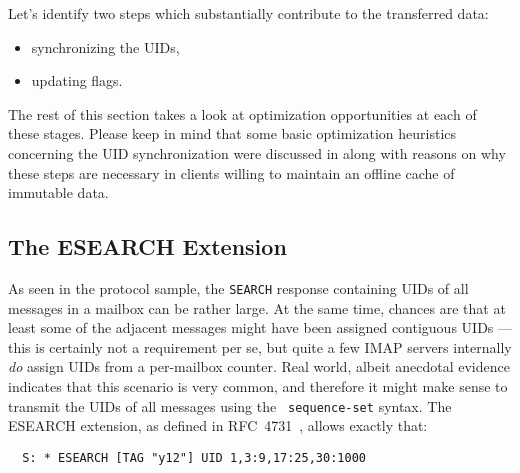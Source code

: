 \documentclass[trojita]{subfiles}
\begin{document}
Let's identify two steps which substantially contribute to the transferred data:

\begin{itemize}
  \item synchronizing the UIDs,
  \item updating flags.
\end{itemize}

The rest of this section takes a look at optimization opportunities at each of these stages.  Please keep in mind that
some basic optimization heuristics concerning the UID synchronization were discussed in 
along with reasons on why these steps are necessary in clients willing to maintain an offline cache of immutable data.

\subsection{The ESEARCH Extension}

As seen in the protocol sample, the {\tt SEARCH} response containing UIDs of all messages in a mailbox can be rather
large.  At the same time, chances are that at least some of the adjacent messages might have been assigned contiguous
UIDs --- this is certainly not a requirement per se, but quite a few IMAP servers internally {\em do} assign UIDs from a
per-mailbox counter.  Real world, albeit anecdotal evidence \cite{cridland-uids-are-often-monotonic} indicates that this
scenario is very common, and therefore it might make sense to transmit the UIDs of all messages using the {\tt
sequence-set} \cite[p. 89]{rfc3501} syntax.  The ESEARCH extension, as defined in RFC~4731~\cite{rfc4731}, allows
exactly that:

\begin{verbatim}
  S: * ESEARCH [TAG "y12"] UID 1,3:9,17:25,30:1000
\end{verbatim}
\end{document}
